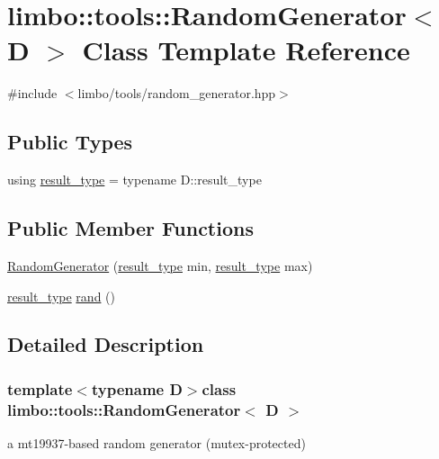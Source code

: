 \hypertarget{classlimbo_1_1tools_1_1_random_generator}{}\section{limbo\+:\+:tools\+:\+:Random\+Generator$<$ D $>$ Class Template Reference}
\label{classlimbo_1_1tools_1_1_random_generator}


{\ttfamily \#include $<$limbo/tools/random\+\_\+generator.\+hpp$>$}

\subsection*{Public Types}
\begin{DoxyCompactItemize}
\item 
using \hyperlink{classlimbo_1_1tools_1_1_random_generator_ae5fdd214eb4fb253cf9f35b9ca7451ba}{result\+\_\+type} = typename D\+::result\+\_\+type
\end{DoxyCompactItemize}
\subsection*{Public Member Functions}
\begin{DoxyCompactItemize}
\item 
\hyperlink{classlimbo_1_1tools_1_1_random_generator_a233f8d29415dfa248b01a144578ff925}{Random\+Generator} (\hyperlink{classlimbo_1_1tools_1_1_random_generator_ae5fdd214eb4fb253cf9f35b9ca7451ba}{result\+\_\+type} min, \hyperlink{classlimbo_1_1tools_1_1_random_generator_ae5fdd214eb4fb253cf9f35b9ca7451ba}{result\+\_\+type} max)
\item 
\hyperlink{classlimbo_1_1tools_1_1_random_generator_ae5fdd214eb4fb253cf9f35b9ca7451ba}{result\+\_\+type} \hyperlink{classlimbo_1_1tools_1_1_random_generator_a8428af24ab2e4eb744563d12180b6246}{rand} ()
\end{DoxyCompactItemize}


\subsection{Detailed Description}
\subsubsection*{template$<$typename D$>$class limbo\+::tools\+::\+Random\+Generator$<$ D $>$}

a mt19937-\/based random generator (mutex-\/protected)

